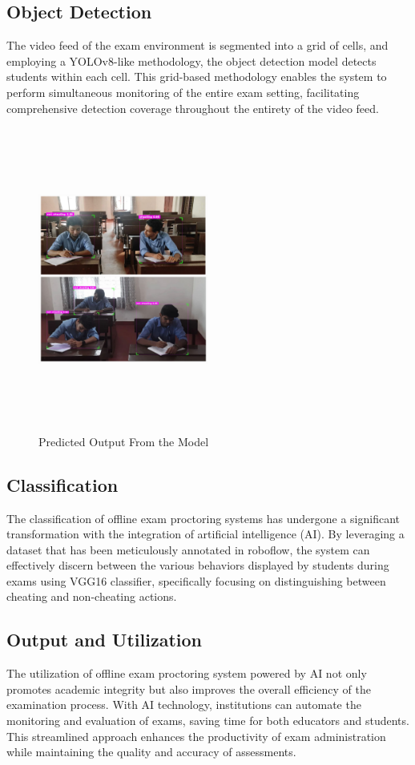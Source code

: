 \documentclass[conference]{IEEEtran}
\begin{document}
\subsection{Object Detection}
The video feed of the exam environment is segmented into a grid of cells, and employing a YOLOv8-like methodology, the object detection model detects students within each cell. This grid-based methodology enables the system to perform simultaneous monitoring of the entire exam setting, facilitating comprehensive detection coverage throughout the entirety of the video feed.

\begin{figure}[htbp]
\centering
\includegraphics[width=0.5\textwidth, height=10cm]{images/detection.jpeg}  %
\caption{Predicted Output From the Model}
\label{fig}
\end{figure}


\subsection{Classification}
The classification of offline exam proctoring systems has undergone a significant transformation with the integration of artificial intelligence (AI). By leveraging a dataset that has been meticulously annotated in roboflow, the system can effectively discern between the various behaviors displayed by students during exams using VGG16 classifier, specifically focusing on distinguishing between cheating and non-cheating actions.

\subsection{Output and Utilization}
 The utilization of offline exam proctoring system powered by AI not only promotes academic integrity but also improves the overall efficiency of the examination process. With AI technology, institutions can automate the monitoring and evaluation of exams, saving time for both educators and students. This streamlined approach enhances the productivity of exam administration while maintaining the quality and accuracy of assessments.
\end{document}
